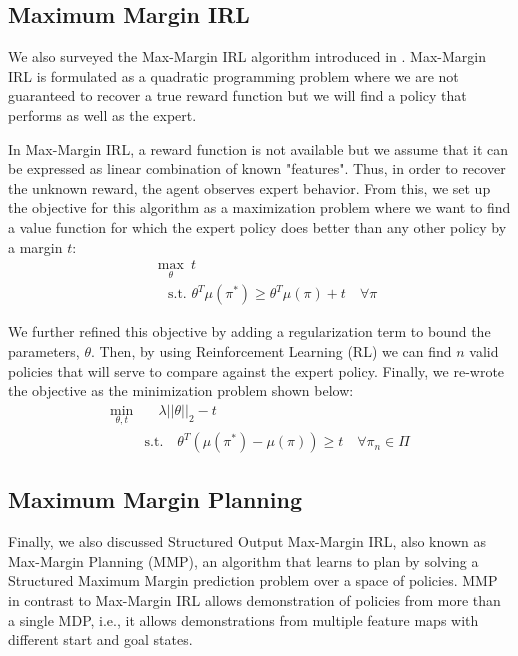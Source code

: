 \documentclass[11pt]{article}
\begin{document}
\subsection{Maximum Margin IRL}

We also surveyed the Max-Margin IRL algorithm introduced in \cite{MMIRL}. Max-Margin IRL is formulated as a quadratic programming problem where we are not guaranteed to recover a true reward function but we will find a policy that performs as well as the expert. 

In Max-Margin IRL, a reward function is not available but we assume that it can be expressed as linear combination of known "features". Thus, in order to recover the unknown reward, the agent observes expert behavior. From this, we set up the objective for this algorithm as a maximization problem where we want to find a value function for which the expert policy does better than any other policy by a margin $t$:
\begin{equation}
    \begin{split}
    &\max_\theta ~t \\
    &\quad\text{s.t. } \theta^T \mu(\pi^\ast) \geq {\theta}^T {\mu}(\pi) + t \quad \forall \pi
    \end{split}
\end{equation}

We further refined this objective by adding a regularization term to bound the parameters, $\theta$. Then, by using Reinforcement Learning (RL) we can find $n$ valid policies that will serve to compare against the expert policy. Finally, we re-wrote the objective as the minimization problem shown below:
\begin{equation}
    \label{eq:min_obj_mmirl}
    \begin{split}
        \min\limits_{\theta, t} & \quad\lambda ||\theta||_2 - t \\
        & \textrm{s.t.} \quad {\theta}^T({\mu}(\pi^\ast) - {\mu}(\pi)) \geq t \quad \forall \pi_n \in \Pi
    \end{split}
\end{equation}


\subsection{Maximum Margin Planning}

Finally, we also discussed Structured Output Max-Margin IRL, also known as Max-Margin Planning (MMP)\cite{MMP}, an algorithm that learns to plan by solving a Structured Maximum Margin prediction problem over a space of policies. MMP in contrast to Max-Margin IRL allows demonstration of policies from more than a single MDP, i.e., it allows demonstrations from multiple feature maps with different start and goal states.
\end{document}
